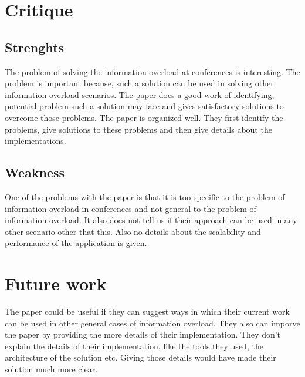 \documentclass[12pt, onecolumn]{IEEEtran}
\begin{document}
\section{Critique}
\subsection{Strenghts}
The problem of solving the information overload at conferences is interesting.
The problem is important because, such a solution can be used in solving other
information overload scenarios. The paper does a good work of identifying,
potential problem such a solution may face and gives satisfactory solutions to
overcome those problems. The paper is organized well. They first identify the
problems, give solutions to these problems and then give details about the
implementations.

\subsection{Weakness}
One of the problems with the paper is that it is too specific to the problem of
information overload in conferences and not general to the problem of information
overload. It also does not tell us if their approach can be used in any other
scenario other that this. Also no details about the scalability and performance
of the application is given.

\section{Future work}
The paper could be useful if they can suggest ways in which their current work
can be used in other general cases of information overload. They also can imporve
the paper by providing the more details of their implementation. They don't
explain the details of their implementation, like the tools they used, the
architecture of the solution etc. Giving those details would have made their
solution much more clear.



 
\end{document}
